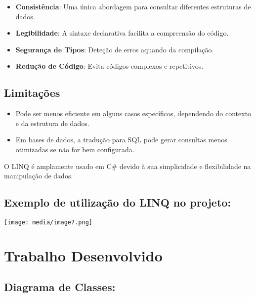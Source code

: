 \documentclass[
]{article}
\begin{document}
\begin{itemize}
\item
  \textbf{Consistência}: Uma única abordagem para consultar diferentes
  estruturas de dados.
\item
  \textbf{Legibilidade}: A sintaxe declarativa facilita a compreensão do
  código.
\item
  \textbf{Segurança de Tipos}: Deteção de erros aquando da compilação.
\item
  \textbf{Redução de Código}: Evita códigos complexos e repetitivos.
\end{itemize}

\hypertarget{limitauxe7uxf5es}{%
\subsection{Limitações}\label{limitauxe7uxf5es}}

\begin{itemize}
\item
  Pode ser menos eficiente em alguns casos específicos, dependendo do
  contexto e da estrutura de dados.
\item
  Em bases de dados, a tradução para SQL pode gerar consultas menos
  otimizadas se não for bem configurada.
\end{itemize}

O LINQ é amplamente usado em C\# devido à sua simplicidade e
flexibilidade na manipulação de dados.

\hypertarget{exemplo-de-utilizauxe7uxe3o-do-linq-no-projeto}{%
\subsection{Exemplo de utilização do LINQ no
projeto:}\label{exemplo-de-utilizauxe7uxe3o-do-linq-no-projeto}}

\texttt{[image: media/image7.png]}

\hypertarget{trabalho-desenvolvido}{%
\section{\texorpdfstring{Trabalho Desenvolvido
}{Trabalho Desenvolvido }}\label{trabalho-desenvolvido}}

\hypertarget{diagrama-de-classes}{%
\subsection{Diagrama de Classes:}\label{diagrama-de-classes}}
\end{document}

